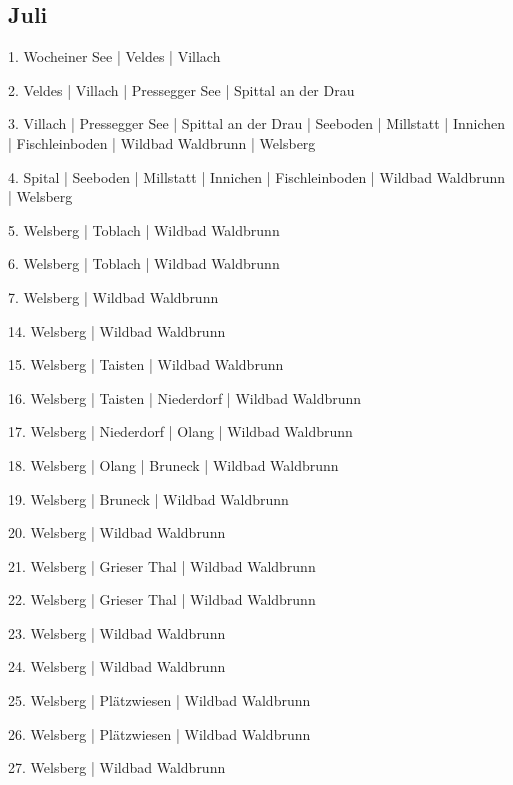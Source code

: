 \documentclass[twoside=false,titlepage=false,open=any, parskip=never, fontsize=10pt, headings=small, chapterprefix=false, appendixprefix=false, DIV=15]{scrbook}
\begin{document}
\begin{multicols}{3}
            \section*{Juli}
            1. Wocheiner See | Veldes | Villach\par
            2. Veldes | Villach | Pressegger See | Spittal an der Drau\par
            3. Villach | Pressegger See | Spittal an der Drau | Seeboden | Millstatt | Innichen | Fischleinboden | Wildbad Waldbrunn | Welsberg\par
            4. Spital | Seeboden | Millstatt | Innichen | Fischleinboden | Wildbad Waldbrunn | Welsberg\par
            5. Welsberg | Toblach | Wildbad Waldbrunn\par
            6. Welsberg | Toblach | Wildbad Waldbrunn\par
            7. Welsberg | Wildbad Waldbrunn\par
            14. Welsberg | Wildbad Waldbrunn\par
            15. Welsberg | Taisten | Wildbad Waldbrunn\par
            16. Welsberg | Taisten | Niederdorf | Wildbad Waldbrunn\par
            17. Welsberg | Niederdorf | Olang | Wildbad Waldbrunn\par
            18. Welsberg | Olang | Bruneck | Wildbad Waldbrunn\par
            19. Welsberg | Bruneck | Wildbad Waldbrunn\par
            20. Welsberg | Wildbad Waldbrunn\par
            21. Welsberg | Grieser Thal | Wildbad Waldbrunn\par
            22. Welsberg | Grieser Thal | Wildbad Waldbrunn\par
            23. Welsberg | Wildbad Waldbrunn\par
            24. Welsberg | Wildbad Waldbrunn\par
            25. Welsberg | Plätzwiesen | Wildbad Waldbrunn\par
            26. Welsberg | Plätzwiesen | Wildbad Waldbrunn\par
            27. Welsberg | Wildbad Waldbrunn\par

\end{multicols}
\end{document}

